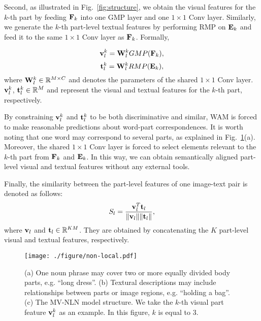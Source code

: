 \documentclass[journal]{IEEEtran}
\begin{document}
Second, as illustrated in Fig.~\ref{fig:structure}, we obtain the visual features for the $k$-th part by feeding ${\bf{F}}_k$ into one GMP layer and one $1\times 1$ Conv layer. Similarly, we generate the $k$-th part-level textual features by performing RMP on ${\bf{E}}_k$ and feed it to the same $1\times 1$ Conv layer as ${\bf{F}}_k$. Formally,

\begin{equation}
{{\bf{v}}_l^k} = {\bf{W}}_{l}^k GMP({{\bf{F}}_k}),
\end{equation}
\begin{equation}
{{\bf{t}}_l^k} = {\bf{W}}_l^k RMP({\bf{E}}_k),
\end{equation}
where ${\bf{W}}_{l}^{k} \in \mathbb{R}^{M \times C}$ and denotes the parameters of the shared $1\times 1$ Conv layer. ${\bf{v}}_l^k$, ${\bf{t}}_l^k \in \mathbb{R}^{M}$ and represent the visual and textual features for the $k$-th part, respectively.

By constraining ${\bf{v}}_l^k$ and ${\bf{t}}_l^k$  to be both discriminative and similar, WAM is forced to make reasonable predictions about word-part correspondences. It is worth noting that one word may correspond to several parts, as explained in Fig.~\ref{fig:non-local}(a). Moreover, the shared $1\times1$ Conv layer is forced to select elements relevant to the $k$-th part from ${\bf{F}}_k$ and ${\bf{E}}_k$. In this way, we can obtain semantically aligned part-level visual and textual features without any external tools.

Finally, the similarity between the part-level features of one image-text pair is denoted as follows:
\begin{equation}
S_{l}=\frac{{\bf{v}}_l^T {\bf{t}}_l}{\|{\bf{v}}_l\| \|{\bf{t}}_l\|},
\label{equ:cosine_similarity}
\end{equation}
where ${\bf{v}}_l$ and ${{\bf{t}}_l} \in \mathbb{R}^{KM} $. They are obtained by concatenating the $K$ part-level visual and textual features, respectively.

\begin{figure}[t]
\begin{center}
\texttt{[image: ./figure/non-local.pdf]}
\end{center}
   \caption{(a) One noun phrase may cover two or more equally divided body parts, e.g. ``long dress''. (b) Textural descriptions may include relationships between parts or image regions, e.g. ``holding a bag''. (c) The MV-NLN model structure. We take the $k$-th visual part feature ${\bf{v}}_{l}^{k}$ as an example. In this figure, $k$ is equal to 3.}
\label{fig:non-local}
\end{figure}
\end{document}
